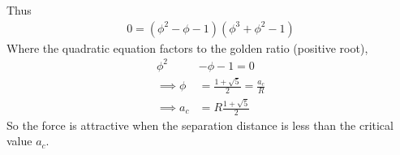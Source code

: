\documentclass[../main.tex]{subfiles}
\begin{document}
\begin{center}
\end{center}
Thus
\begin{align*}
    0 = (\phi^2 - \phi - 1)(\phi^3 + \phi^2 - 1)
\end{align*}
Where the quadratic equation factors to the golden ratio (positive root),
\begin{align*}
    \phi^2 &- \phi - 1 = 0 \\
    \implies \phi &= \frac{1 + \sqrt{5}}{2} = \frac{a_c}{R} \\
    \implies a_c &= R \frac{1 + \sqrt{5}}{2}
\end{align*}
So the force is attractive when the separation distance is less than the critical value $a_c$.

\newpage
\end{document}
